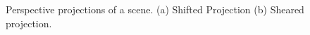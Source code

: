 \begin{figure}
	\subfigure[]{
		\centering
		
		\label{fig:ShiftedPerspectiveProjection}
	}
	\hfill
	\subfigure[]{
		\centering
		
		\label{fig:RectifiedPerspectiveProjection}
	}
	\caption{Perspective projections of a scene. (a) Shifted Projection (b) Sheared projection.}
\end{figure}


